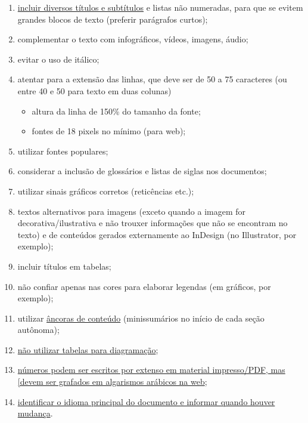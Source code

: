 \begin{enumerate}
\item \href{https://axesslab.com/fonts-dont-matter/}{incluir diversos títulos e subtítulos} e listas não numeradas, para que se evitem grandes blocos de texto (preferir parágrafos curtos);
\item complementar o texto com infográficos, vídeos, imagens, áudio;
\item evitar o uso de itálico;
\item atentar para a extensão das linhas, que deve ser de 50 a 75 caracteres (ou entre 40 e 50 para texto em duas colunas)
\begin{itemize}
\item altura da linha de 150\% do tamanho da fonte;
\item fontes de 18 pixels no mínimo (para web);
\end{itemize}
\item utilizar fontes populares;
\item considerar a inclusão de glossários e listas de siglas nos documentos;
\item utilizar sinais gráficos corretos (reticências etc.);
\item textos alternativos para imagens (exceto quando a imagem for decorativa/ilustrativa e não trouxer informações que não se encontram no texto) e de conteúdos gerados externamente ao InDesign (no Illustrator, por exemplo);
\item incluir títulos em tabelas;
\item não confiar apenas nas cores para elaborar legendas (em gráficos, por exemplo);
\item utilizar \href{https://www.gov.br/governodigital/pt-br/acessibilidade-e-usuario/acessibilidade-digital/eMAGv31.pdf}{âncoras de conteúdo} (minissumários no início de cada seção autônoma);
\item\href{https://www.gov.br/governodigital/pt-br/acessibilidade-e-usuario/acessibilidade-digital/eMAGv31.pdf}{não utilizar tabelas para diagramação};
\item\href{https://www.nngroup.com/articles/web-writing-show-numbers-as-numerals/}{números podem ser escritos por extenso em material impresso/PDF, mas [devem ser grafados em algarismos arábicos na web};
\item\href{https://www.gov.br/governodigital/pt-br/acessibilidade-e-usuario/acessibilidade-digital/eMAGv31.pdf}{identificar o idioma principal do documento e informar quando houver mudança}.
\end{enumerate}


